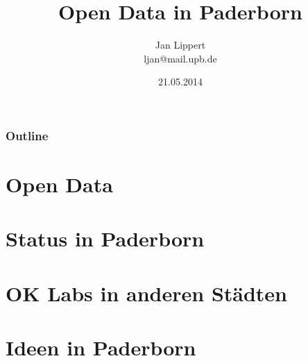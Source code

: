 \documentclass[10pt,a4paper]{beamer}
\author{Jan Lippert\\ljan@mail.upb.de}
\title{Open Data in Paderborn}
\date{21.05.2014}
\begin{document}
%

\begin{frame}
\titlepage
\end{frame}

\begin{frame}
\frametitle{Outline}
\tableofcontents[part=1,pausesections]
\end{frame}

\section{Open Data}

\section{Status in Paderborn}

\section{OK Labs in anderen Städten}

\section{Ideen in Paderborn}
\end{document}
